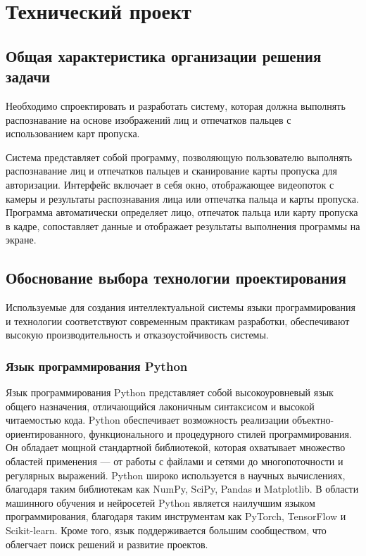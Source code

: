 \section{Технический проект}
\subsection{Общая характеристика организации решения задачи}

Необходимо спроектировать и разработать систему, которая должна выполнять распознавание на основе изображений лиц и отпечатков пальцев с использованием карт пропуска.

Система представляет собой программу, позволяющую пользователю выполнять распознавание лиц и отпечатков пальцев и сканирование карты пропуска для авторизации. Интерфейс включает в себя окно, отображающее видеопоток с камеры и результаты распознавания лица или отпечатка пальца и карты пропуска. Программа автоматически определяет лицо, отпечаток пальца или карту пропуска в кадре, сопоставляет данные и отображает результаты выполнения программы на экране. 

\subsection{Обоснование выбора технологии проектирования}

Используемые для создания интеллектуальной системы языки программирования и технологии соответствуют современным практикам разработки, обеспечивают высокую производительность и отказоустойчивость системы.

\subsubsection{Язык программирования Python}

Язык программирования Python представляет собой высокоуровневый язык общего назначения, отличающийся лаконичным синтаксисом и высокой читаемостью кода. Python обеспечивает возможность реализации объектно-ориентированного, функционального и процедурного стилей программирования. Он обладает мощной стандартной библиотекой, которая охватывает множество областей применения — от работы с файлами и сетями до многопоточности и регулярных выражений. Python широко используется в научных вычислениях, благодаря таким библиотекам как NumPy, SciPy, Pandas и Matplotlib. В области машинного обучения и нейросетей Python является наилучшим языком программирования, благодаря таким инструментам как PyTorch, TensorFlow и Scikit-learn. Кроме того, язык поддерживается большим сообществом, что облегчает поиск решений и развитие проектов.

